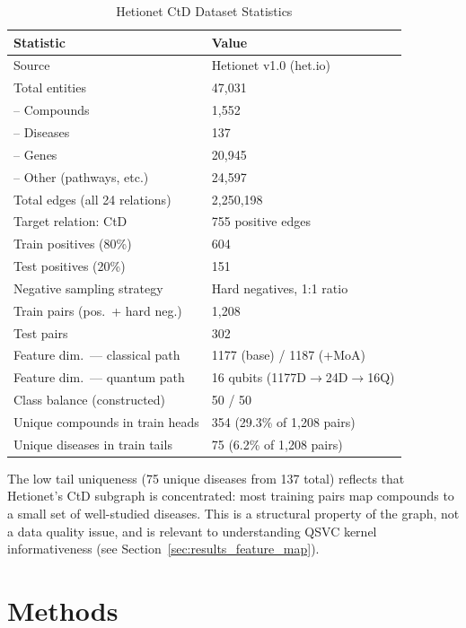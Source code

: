 \documentclass[10pt,twocolumn]{article}
\begin{document}
\begin{table}[t]
\centering
\caption{Hetionet CtD Dataset Statistics}
\label{tab:dataset}
\begin{tabular}{@{}ll@{}}
\toprule
\textbf{Statistic} & \textbf{Value} \\
\midrule
Source & Hetionet v1.0 (het.io) \\
Total entities & 47,031 \\
\quad-- Compounds & 1,552 \\
\quad-- Diseases & 137 \\
\quad-- Genes & 20,945 \\
\quad-- Other (pathways, etc.) & 24,597 \\
Total edges (all 24 relations) & 2,250,198 \\
Target relation: CtD & 755 positive edges \\
Train positives (80\%) & 604 \\
Test positives (20\%) & 151 \\
Negative sampling strategy & Hard negatives, 1:1 ratio \\
Train pairs (pos.\ + hard neg.) & 1,208 \\
Test pairs & 302 \\
Feature dim.\ --- classical path & 1177 (base) / 1187 (+MoA) \\
Feature dim.\ --- quantum path & 16 qubits (1177D$\to$24D$\to$16Q) \\
Class balance (constructed) & 50 / 50 \\
Unique compounds in train heads & 354 (29.3\% of 1,208 pairs) \\
Unique diseases in train tails & 75 (6.2\% of 1,208 pairs) \\
\bottomrule
\end{tabular}
\end{table}

The low tail uniqueness (75 unique diseases from 137 total) reflects that Hetionet's CtD subgraph is concentrated: most training pairs map compounds to a small set of well-studied diseases. This is a structural property of the graph, not a data quality issue, and is relevant to understanding QSVC kernel informativeness (see Section~\ref{sec:results_feature_map}).

\section{Methods}
\end{document}
